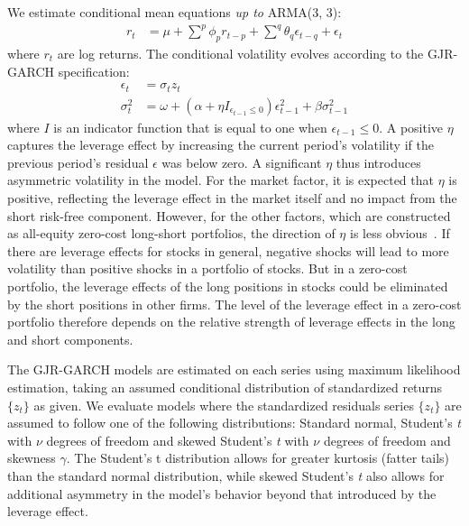We estimate conditional mean equations \emph{up to} ARMA(3, 3):
\begin{align}
  r_t &=
    \mu +
    \sum^p \phi_p r_{t - p} +
    \sum^q \theta_q \epsilon_{t - q} + 
    \epsilon_t
\end{align}
where $r_t$ are log returns. The conditional volatility evolves according to the GJR-GARCH specification:
\begin{align}
  \epsilon_t &= \sigma_t z_t \\
  \sigma_t^2 &=
    \omega +
    (\alpha + \eta I_{\epsilon_{t-1} \leq 0}) \epsilon_{t - 1}^2 +
    \beta \sigma^2_{t - 1}
\end{align}
where $I$ is an indicator function that is equal to one when $\epsilon_{t-1} \leq 0$. A positive $\eta$ captures the leverage effect by increasing the current period's volatility if the previous period's residual $\epsilon$ was below zero. A significant $\eta$ thus introduces asymmetric volatility in the model. For the market factor, it is expected that $\eta$ is positive, reflecting the leverage effect in the market itself and no impact from the short risk-free component. However, for the other factors, which are constructed as all-equity zero-cost long-short portfolios, the direction of $\eta$ is less obvious~\autocite{ChristoffersenLanglois2013}. If there are leverage effects for stocks in general, negative shocks will lead to more volatility than positive shocks in a portfolio of stocks. But in a zero-cost portfolio, the leverage effects of the long positions in stocks could be eliminated by the short positions in other firms. The level of the leverage effect in a zero-cost portfolio therefore depends on the relative strength of leverage effects in the long and short components.

The GJR-GARCH models are estimated on each series using maximum likelihood estimation, taking an assumed conditional distribution of standardized returns $\{z_t\}$ as given. We evaluate models where the standardized residuals series $\{z_t\}$ are assumed to follow one of the following distributions: Standard normal, Student's \textit{t} with $\nu$ degrees of freedom and skewed Student's \textit{t} with $\nu$ degrees of freedom and skewness $\gamma$. The Student's t distribution allows for greater kurtosis (fatter tails) than the standard normal distribution, while skewed Student's \textit{t} also allows for additional asymmetry in the model's behavior beyond that introduced by the leverage effect.


